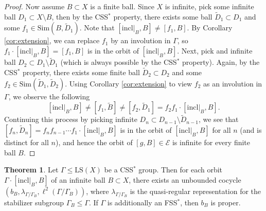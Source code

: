 \documentclass[12pt]{amsart}
\numberwithin{equation}{subsection}
\theoremstyle{definition}
\newtheorem{theorem}{Theorem}[section]
\theoremstyle{definition}
\theoremstyle{remark}
\begin{document}
\begin{proof}
    Now assume $B \subset X$ is a finite ball. Since $X$ is infinite, pick some infinite ball $D_1 \subset X \setminus B$, then by the CSS$^*$ property, there exists some ball $\widetilde D_1 \subset D_1$ and some $f_1 \in \text{Sim}(B, \widetilde D_1)$. Note that $[\text{incl}\vert_B,B] \neq [f_1,B]$. By Corollary \ref{cor:extension}, we can replace $f_1$ by an involution in $\Gamma$, so $f_1 \cdot [\text{incl}\vert_B,B] = [f_1,B]$ is in the orbit of $[\text{incl}\vert_B,B]$. Next, pick and infinite ball $D_2 \subset D_1 \setminus \widetilde D_1$ (which is always possible by the CSS$^*$ property).  Again, by the CSS$^*$ property, there exists some finite ball $\widetilde D_2 \subset D_2$ and some $f_2 \in \text{Sim}(\widetilde D_1, \widetilde D_2)$. Using Corollary \ref{cor:extension} to view $f_2$ as an involution in $\Gamma$, we observe the following
    \[ [\text{incl}\vert_B,B] \neq [f_1,\widetilde B] \neq [f_2,\widetilde D_1] = f_2f_1\cdot [\text{incl}\vert_B,B].\]
    Continuing this process by picking infinite $D_n \subset D_{n-1}\setminus \widetilde D_{n-1}$, we see that $[f_n,\widetilde D_n]=f_nf_{n-1}\cdots f_1\cdot [\text{incl}\vert_B,B]$ is in the orbit of $[\text{incl}\vert_B,B]$ for all $n$ (and is distinct for all $n$), and hence the orbit of $[g,B] \in \mathcal E$ is infinite for every finite ball $B$. 
\end{proof}





\begin{theorem}\label{thm:cocycleProj}
     Let $\Gamma \leq \text{LS}(X)$ be a CSS$^*$ group. Then for each orbit $\Gamma \cdot [\text{incl}\vert_B, B]$ of an infinite ball $B \subset X$, there exists an unbounded cocycle $(b_B,\lambda_{\Gamma/\Gamma_B},\ell^2(\Gamma / \Gamma_B))$, where $\lambda_{\Gamma / \Gamma_B}$ is the quasi-regular representation for the stabilizer subgroup $\Gamma_B \leq \Gamma$. If $\Gamma$ is additionally an FSS$^*$, then $b_B$ is proper. 
\end{theorem}
\end{document}
